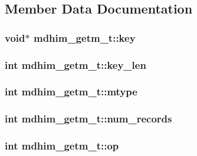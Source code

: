\subsection{Member Data Documentation}
\hypertarget{structmdhim__getm__t_a53c3aff6037a3e693e09ff4e98bd7eba}{
\subsubsection[{key}]{\setlength{\rightskip}{0pt plus 5cm}void$\ast$ mdhim\-\_\-getm\-\_\-t\-::key}}\label{d9/d54/structmdhim__getm__t_a53c3aff6037a3e693e09ff4e98bd7eba}
\hypertarget{structmdhim__getm__t_a8942a21db02e749c3f3b04b32fea795e}{
\subsubsection[{key\-\_\-len}]{\setlength{\rightskip}{0pt plus 5cm}int mdhim\-\_\-getm\-\_\-t\-::key\-\_\-len}}\label{d9/d54/structmdhim__getm__t_a8942a21db02e749c3f3b04b32fea795e}
\hypertarget{structmdhim__getm__t_a803aef9942bd6bd39d10c22f4f1205d3}{
\subsubsection[{mtype}]{\setlength{\rightskip}{0pt plus 5cm}int mdhim\-\_\-getm\-\_\-t\-::mtype}}\label{d9/d54/structmdhim__getm__t_a803aef9942bd6bd39d10c22f4f1205d3}
\hypertarget{structmdhim__getm__t_ad585955cf1b7a3ffce40fc44062583e9}{
\subsubsection[{num\-\_\-records}]{\setlength{\rightskip}{0pt plus 5cm}int mdhim\-\_\-getm\-\_\-t\-::num\-\_\-records}}\label{d9/d54/structmdhim__getm__t_ad585955cf1b7a3ffce40fc44062583e9}
\hypertarget{structmdhim__getm__t_a81dd92f402e433928b8b3bae7ccdefd8}{
\subsubsection[{op}]{\setlength{\rightskip}{0pt plus 5cm}int mdhim\-\_\-getm\-\_\-t\-::op}}\label{d9/d54/structmdhim__getm__t_a81dd92f402e433928b8b3bae7ccdefd8}
